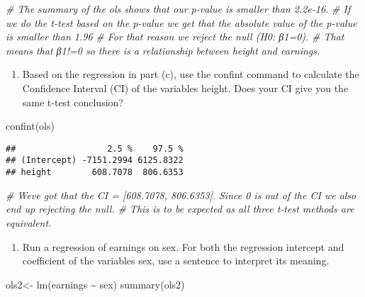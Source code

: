 \documentclass[
]{article}
\newenvironment{Shaded}{\begin{snugshade}}{\end{snugshade}}
\newcommand{\CommentTok}[1]{\textcolor[rgb]{0.56,0.35,0.01}{\textit{#1}}}
\newcommand{\FunctionTok}[1]{\textcolor[rgb]{0.00,0.00,0.00}{#1}}
\newcommand{\NormalTok}[1]{#1}
\newcommand{\OtherTok}[1]{\textcolor[rgb]{0.56,0.35,0.01}{#1}}
\newcommand{\SpecialCharTok}[1]{\textcolor[rgb]{0.00,0.00,0.00}{#1}}
\providecommand{\tightlist}{%
  \setlength{\itemsep}{0pt}\setlength{\parskip}{0pt}}
\begin{document}
\begin{Shaded}
\begin{Highlighting}[]
\CommentTok{\#     The summary of the ols shows that our p{-}value is smaller than 2.2e{-}16. }
\CommentTok{\#     If we do the t{-}test based on the p{-}value we get that the absolute value of the p{-}value is smaller than 1.96 }
\CommentTok{\#     For that reason we reject the null (H0: β1=0). }
\CommentTok{\#     That means that β1!=0 so there is a relationship between height and earnings.}
\end{Highlighting}
\end{Shaded}

\begin{enumerate}
\def\labelenumi{\roman{enumi})}
\tightlist
\item
  Based on the regression in part (c), use the confint command to
  calculate the Confidence Interval (CI) of the variables height. Does
  your CI give you the same t-test conclusion?
\end{enumerate}

\begin{Shaded}
\begin{Highlighting}[]
\FunctionTok{confint}\NormalTok{(ols)}
\end{Highlighting}
\end{Shaded}

\begin{verbatim}
##                  2.5 %    97.5 %
## (Intercept) -7151.2994 6125.8322
## height        608.7078  806.6353
\end{verbatim}

\begin{Shaded}
\begin{Highlighting}[]
\CommentTok{\# We\textquotesingle{}ve got that the CI = [608.7078, 806.6353]. Since 0 is out of the CI we also end up rejecting the null.}
\CommentTok{\# This is to be expected as all three t{-}test methods are equivalent.}
\end{Highlighting}
\end{Shaded}

\begin{enumerate}
\def\labelenumi{\alph{enumi})}
\setcounter{enumi}{9}
\tightlist
\item
  Run a regression of earnings on sex. For both the regression intercept
  and coefficient of the variables sex, use a sentence to interpret its
  meaning.
\end{enumerate}

\begin{Shaded}
\begin{Highlighting}[]
\NormalTok{ols2}\OtherTok{\textless{}{-}} \FunctionTok{lm}\NormalTok{(earnings }\SpecialCharTok{\textasciitilde{}}\NormalTok{ sex)}
\FunctionTok{summary}\NormalTok{(ols2)}
\end{Highlighting}
\end{Shaded}
\end{document}
